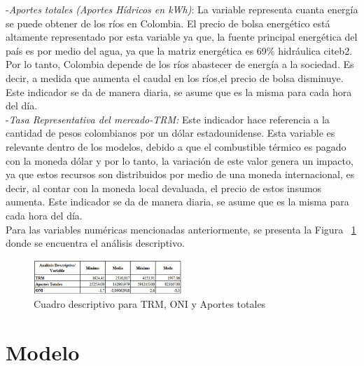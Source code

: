 \documentclass[conference, 10pt]{IEEEtran}
\begin{document}
-\textit{Aportes totales (Aportes Hídricos en kWh)}: La variable representa cuanta energía se puede obtener de los ríos en Colombia. El precio de bolsa energético está altamente representado por esta variable ya que, la fuente principal energética del país es por medio del agua, ya que la matriz energética es 69\% hidráulica cite{b2}. Por lo tanto, Colombia depende de los ríos abastecer de energía a la sociedad. Es decir, a medida que aumenta el caudal en los ríos,el precio de bolsa disminuye. Este indicador se da de manera diaria, se asume que es la misma para cada hora del día.\\

-\textit{Tasa Representativa del mercado-TRM:} Este indicador hace referencia a la cantidad de pesos colombianos por un dólar estadounidense. Esta variable es relevante dentro de los modelos, debido a que el combustible térmico es pagado con la moneda dólar y por lo tanto, la variación de este valor genera un impacto, ya que estos recursos son distribuidos por medio de una moneda internacional, es decir, al contar con la moneda local devaluada, el precio de estos insumos aumenta. Este indicador se da de manera diaria, se asume que es la misma para cada hora del día.\\

Para las variables numéricas mencionadas anteriormente, se presenta la Figura ~\ref{fig_6} donde se encuentra el análisis descriptivo. 

\begin{figure}[htbp]
\centerline{\includegraphics[width=0.5\textwidth]{../Images/Cuadro_descriptivo_varias_var.png}}
\caption{Cuadro descriptivo para TRM, ONI y Aportes totales}
\label{fig_6}
\end{figure}


\section{Modelo} \label{BB}
\end{document}
